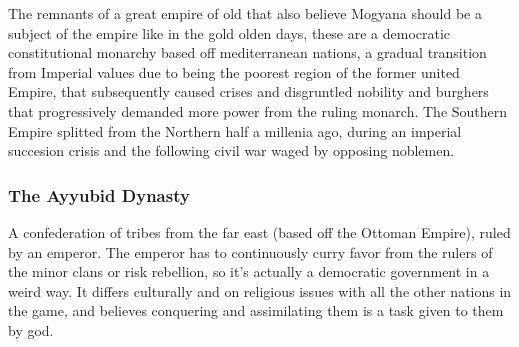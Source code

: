 \documentclass[a4paper, 11pt]{article}
\begin{document}
The remnants of a great empire of old that also believe Mogyana should be a subject of the empire like in the gold olden days, these are a democratic constitutional monarchy based off mediterranean nations, a gradual transition from Imperial values due to being the poorest region of the former united Empire, that subsequently caused crises and disgruntled nobility and burghers that progressively demanded more power from the ruling monarch. The Southern Empire splitted from the Northern half a millenia ago, during an imperial succesion crisis and the following civil war waged by opposing noblemen.

\subsubsection*{The Ayyubid Dynasty}

A confederation of tribes from the far east (based off the Ottoman Empire), ruled by an emperor. The emperor has to continuously curry favor from the rulers of the minor clans or risk rebellion, so it's actually a democratic government in a weird way. It differs culturally and on religious issues with all the other nations in the game, and believes conquering and assimilating them is a task given to them by god.
\end{document}
